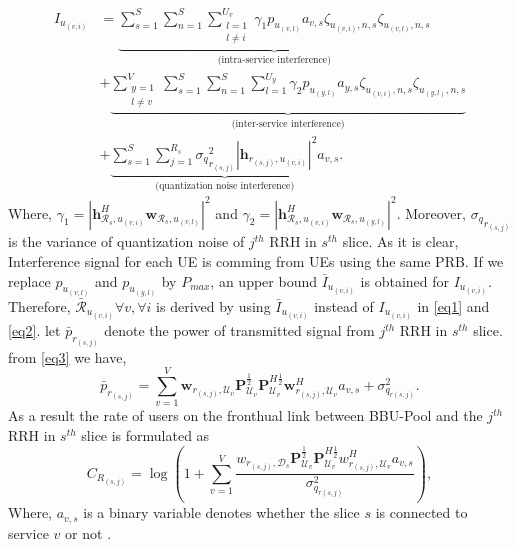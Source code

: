 \documentclass[conference]{IEEEtran}
\begin{document}
\begin{equation}
\begin{split}
 I_{u_{(v,i)}} &= 
 \underbrace{\sum_{s=1}^{S}\sum_{n=1}^{S}\sum_{\substack{l=1 \\ l\neq i}}^{{U}_v} \gamma_{1}  p_{u_{(v,l)}}a_{v,s}\zeta_{u_(v,i),n,s}\zeta_{u_(v,l),n,s}}_{\text{(intra-service interference)}}\\
&+ \underbrace{\sum_{\substack{y=1 \\ l\neq v}}^{V}\sum_{s=1}^{S}\sum_{n=1}^{S}\sum_{l=1}^{{U}_y} \gamma_{2}  p_{u_{(y,l)}}a_{y,s} \zeta_{u_(v,i),n,s}\zeta_{u_(y,l),n,s}}_{\text{(inter-service interference)}}\\
&+\underbrace{ \sum_{s=1}^{S} \sum_{j=1}^{{R}_s} {\sigma_q}_{r_{(s,j)}}^2 |\boldsymbol{h}_{r_{(s,j)}, u_{(v,i)}}|^2 a_{v,s}}_{\text{(quantization noise interference)}}.
\end{split}
\end{equation}
Where, $\gamma_{1} =|\boldsymbol{h}_{\mathcal{R}_s, u_{(v,i)}}^H \boldsymbol{w}_{\mathcal{R}_{s},u_{(v,l)}}|^2$
and $\gamma_{2} =|\boldsymbol{h}_{\mathcal{R}_s, u_{(v,i)}}^H \boldsymbol{w}_{\mathcal{R}_{s},u_{(y,l)}}|^2$. Moreover,
${\sigma_q}_{r_{(s,j)}}$ is the variance of quantization noise of $j^{th}$ RRH in $s^{th}$ slice.
As it is clear, Interference signal for each UE is comming from UEs using the same PRB.
If we replace $p_{u_{(v,l)}}$ and $p_{u_{(y,l)}}$ by $P_{max}$, an upper bound $\bar{I}_{u_{(v,i)}}$ is obtained for $I_{u_{(v,i)}}$. Therefore, $\bar{\mathcal{R}}_{u_{(v,i)}} \forall v , \forall i$ is derived by using $\bar{I}_{u_{(v,i)}}$ instead of $I_{u_{(v,i)}}$ in  \eqref{eq1} and \eqref{eq2}.\newline
let $\bar{p}_{r_{(s,j)}}$ denote the power of transmitted signal from $j^{th}$ RRH in $s^{th}$ slice.
from \eqref{eq3} we have,
\begin{equation}
\bar{p}_{r_{(s,j)}} = \sum_{v=1}^{V}\boldsymbol{w}_{r_{(s,j)},\mathcal{U}_{v}} \boldsymbol{P}_{\mathcal{U}_v}^{\frac{1}{2}} \boldsymbol{P}_{\mathcal{U}_v}^{H \frac{1}{2}}   \boldsymbol{w}_{r_{(s,j)},\mathcal{U}_{v}}^H a_{v,s} + \sigma_{q_{r(s,j)}}^2.
\end{equation}
As a result the rate of users on the fronthual link between BBU-Pool and the $j^{th}$ RRH in $s^{th}$ slice is formulated as 
\begin{equation}
C_{R_{(s,j)}} = \log{(1+\sum_{v=1}^{V}\frac{w_{r_{(s,j)},\mathcal{D}_{s}} \boldsymbol{P}_{\mathcal{U}_v}^{\frac{1}{2}} \boldsymbol{P}_{\mathcal{U}_v}^{H \frac{1}{2}}   w_{r_{(s,j)},\mathcal{U}_{v}}^H a_{v,s}}{ \sigma_{q_{r(s,j)}}^2})},
\end{equation}
Where, $a_{v,s}$ is a binary variable denotes whether the slice $s$ is connected to service $v$ or not \cite{simeone2016cloud, 1111}.
\end{document}
